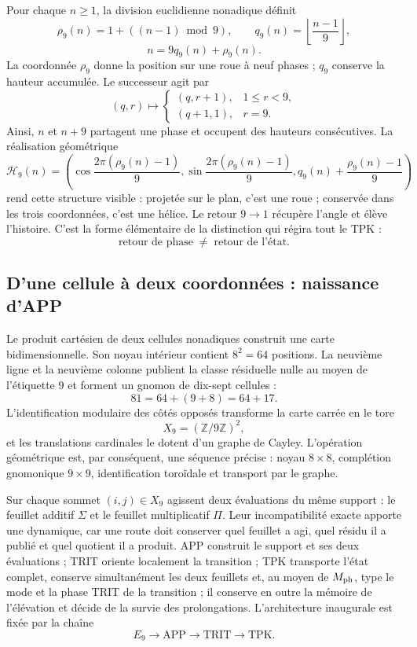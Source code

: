 Pour chaque \(n\ge1\), la division euclidienne nonadique définit
\[
 \rho_9(n)=1+((n-1)\bmod9),
 \qquad
 q_9(n)=\left\lfloor\frac{n-1}{9}\right\rfloor,
\]
\begin{equation}
 n=9q_9(n)+\rho_9(n).
 \label{eq:rueda-helice-nonadica-revfinal}
\end{equation}
La coordonnée \(\rho_9\) donne la position sur une roue à neuf phases ;
\(q_9\) conserve la hauteur accumulée. Le successeur agit par
\[
 (q,r)\longmapsto
 \begin{cases}
 (q,r+1),&1\le r<9,\\
 (q+1,1),&r=9.
 \end{cases}
\]
Ainsi, \(n\) et \(n+9\) partagent une phase et occupent des hauteurs consécutives. La
réalisation géométrique
\[
 \mathcal H_9(n)=
 \left(
  \cos\frac{2\pi(\rho_9(n)-1)}9,
  \sin\frac{2\pi(\rho_9(n)-1)}9,
  q_9(n)+\frac{\rho_9(n)-1}{9}
 \right)
\]
rend cette structure visible : projetée sur le plan, c'est une roue ;
conservée dans les trois coordonnées, c'est une hélice. Le retour \(9\to1\)
récupère l'angle et élève l'histoire. C'est la forme élémentaire de la
distinction qui régira tout le TPK :
\[
 \boxed{\text{retour de phase}\;\neq\;\text{retour de l’état}.}
\]

\subsection{D'une cellule à deux coordonnées : naissance d'APP}

Le produit cartésien de deux cellules nonadiques construit une carte
bidimensionnelle. Son noyau intérieur contient \(8^2=64\) positions. La neuvième
ligne et la neuvième colonne publient la classe résiduelle nulle au moyen de l'étiquette
\(9\) et forment un gnomon de dix-sept cellules :
\[
 81=64+(9+8)=64+17.
\]
L'identification modulaire des côtés opposés transforme la carte carrée
en le tore
\[
 X_9=(\mathbb Z/9\mathbb Z)^2,
\]
et les translations cardinales le dotent d'un graphe de Cayley. L'opération
géométrique est, par conséquent, une séquence précise : noyau
\(8\times8\), complétion gnomonique \(9\times9\), identification toroïdale et
transport par le graphe.

Sur chaque sommet \((i,j)\in X_9\) agissent deux évaluations du même support :
le feuillet additif \(\Sigma\) et le feuillet multiplicatif \(\Pi\). Leur
incompatibilité exacte apporte une dynamique, car une route doit conserver quel
feuillet a agi, quel résidu il a publié et quel quotient il a produit. APP construit le
support et ses deux évaluations ; TRIT oriente localement la transition ; TPK
transporte l'état complet, conserve simultanément les deux feuillets et, au moyen de
\(M_{\rm ph}\), type le mode et la phase TRIT de la transition ; il conserve en outre la
mémoire de l'élévation et décide de la survie des prolongations.
L'architecture inaugurale est fixée par la chaîne
\[
 \boxed{
 E_9\longrightarrow
 \mathrm{APP}\longrightarrow
 \mathrm{TRIT}\longrightarrow
 \mathrm{TPK}.}
\]

